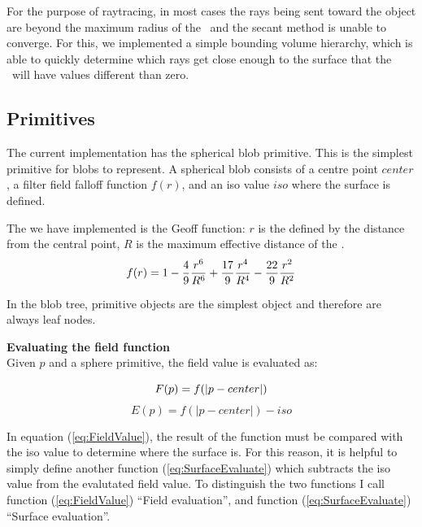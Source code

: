 \documentclass[conference]{acmsiggraph}
\begin{document}
For the purpose of raytracing, in most cases the rays being sent toward the
object are beyond the maximum radius of the \fff\ and the secant method is
unable to converge. For this, we implemented a simple bounding volume
hierarchy, which is able to quickly determine which rays get close enough to
the surface that the \fff\ will have values different than zero.

\subsection{Primitives}
The current implementation has the spherical blob primitive. This is the
simplest primitive for blobs to represent. A spherical blob consists of a
centre point $center$, a filter field falloff function $f(r)$, and an iso value
$iso$ where the surface is defined.

The \fff we have implemented is the Geoff function: $r$ is the defined by the
distance from the central point, $R$ is the maximum effective distance of the
\fff.
\begin{equation}
f(r) = 1 - {4\over9} {r^6 \over R^6} + {17 \over 9} {r^4 \over R ^ 4} -
{22\over 9} {r^2 \over R^2}
\label{eq:GeoffFunction}
\end{equation}

In the blob tree, primitive objects are the simplest object and therefore are
always leaf nodes.

\textbf{Evaluating the field function}\\
Given $p$ and a sphere primitive, the field value is evaluated as:

\begin{equation}
F(p) = f(\lvert p - center \rvert)\\
\label{eq:FieldValue}
\end{equation}
\begin{equation}
E(p) = f(\lvert p - center \rvert) - iso
\label{eq:SurfaceEvaluate}
\end{equation}



In equation (\ref{eq:FieldValue}), the result of the function must be compared with
the iso value to determine where the surface is. For this reason, it is helpful
to simply define another function (\ref{eq:SurfaceEvaluate}) which subtracts the
iso value from the evalutated field value. To distinguish the two functions I
call function (\ref{eq:FieldValue}) ``Field evaluation'', and function
(\ref{eq:SurfaceEvaluate}) ``Surface evaluation''.
\end{document}
